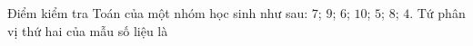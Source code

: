 \begin{ex}
Điểm kiểm tra Toán của một nhóm học sinh như sau: $7$; $9$; $6$; $10$; $5$; $8$; $4$. Tứ phân vị thứ hai của mẫu số liệu là
\end{ex}
